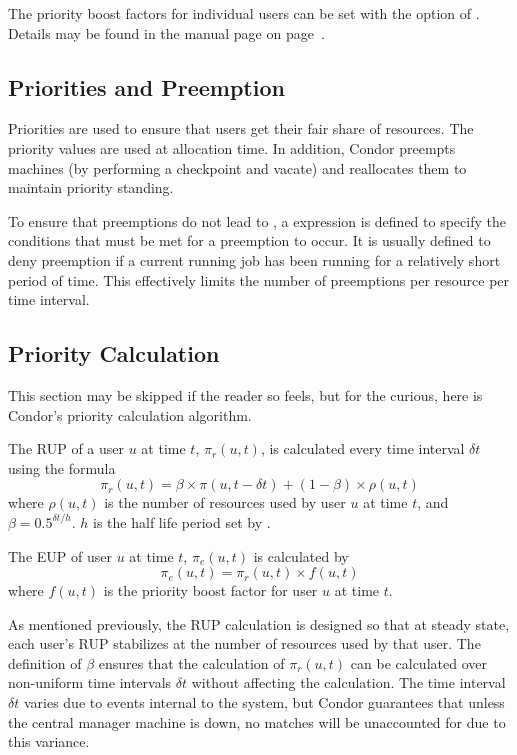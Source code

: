 The priority boost factors for individual users can be set with the 
 option of .
Details may be found in the  manual page 
on page~\pageref{man-condor-userprio}.

\subsection{Priorities and Preemption}
Priorities are used to ensure that users get their fair share of resources.  
The priority values are used at allocation time.
In addition, Condor preempts machines (by performing a checkpoint and
vacate) and reallocates them to maintain priority standing.

To ensure that preemptions do not lead to ,
a  expression is defined to specify the
conditions that must be met for a preemption to occur.
It is usually defined to deny preemption if a current running job
has been running for a relatively short period of time.
This effectively limits the number of preemptions per resource per time
interval.

\subsection{Priority Calculation}
This section may be skipped if the reader so feels, but for the curious,
here is Condor's priority calculation algorithm.

The RUP of a user $u$ at time $t$, $\pi_r(u,t)$, is calculated 
every time interval $\delta t$ using the formula 
$$\pi_r(u,t) = \beta\times\pi(u,t-\delta t) + (1-\beta)\times\rho(u,t)$$
where $\rho(u,t)$ is the number of resources used by user $u$ at time $t$,
and $\beta=0.5^{{\delta t}/h}$. $h$ is the half life period set by 
.

The EUP of user $u$ at time $t$, $\pi_e(u,t)$
is calculated by
$$\pi_e(u,t) = \pi_r(u,t)\times f(u,t)$$
where $f(u,t)$ is the priority boost factor for user $u$ at time $t$.

As mentioned previously, the RUP calculation is designed so that at steady
state, each user's RUP stabilizes at the number of resources used by that user. 
The definition of $\beta$ ensures that the calculation of $\pi_r(u,t)$ can be 
calculated over non-uniform time intervals $\delta t$ without affecting the 
calculation.  The time interval $\delta t$ varies due to events internal to 
the system, but Condor guarantees that unless the central manager machine is 
down, no matches will be unaccounted for due to this variance.
